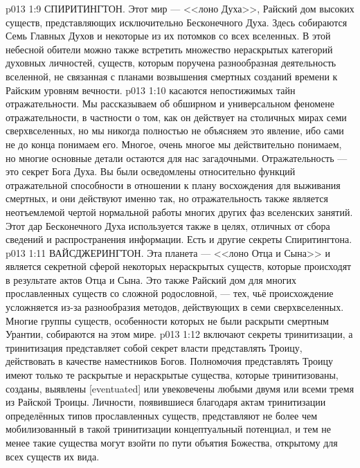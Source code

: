 \vs p013 1:9 СПИРИТИНГТОН. Этот мир --- <<лоно Духа>>, Райский дом высоких существ, представляющих исключительно Бесконечного Духа. Здесь собираются Семь Главных Духов и некоторые из их потомков со всех вселенных. В этой небесной обители можно также встретить множество нераскрытых категорий духовных личностей, существ, которым поручена разнообразная деятельность вселенной, не связанная с планами возвышения смертных созданий времени к Райским уровням вечности.
\vs p013 1:10 \pc {} касаются непостижимых тайн отражательности. Мы рассказываем об обширном и универсальном феномене отражательности, в частности о том, как он действует на столичных мирах семи сверхвселенных, но мы никогда полностью не объясняем это явление, ибо сами не до конца понимаем его. Многое, очень многое мы действительно понимаем, но многие основные детали остаются для нас загадочными. Отражательность --- это секрет Бога Духа. Вы были осведомлены относительно функций отражательной способности в отношении к плану восхождения для выживания смертных, и они действуют именно так, но отражательность также является неотъемлемой чертой нормальной работы многих других фаз вселенских занятий. Этот дар Бесконечного Духа используется также в целях, отличных от сбора сведений и распространения информации. Есть и другие секреты Спиритингтона.
\vs p013 1:11 ВАЙСДЖЕРИНГТОН. Эта планета --- <<лоно Отца и Сына>> и является секретной сферой некоторых нераскрытых существ, которые происходят в результате актов Отца и Сына. Это также Райский дом для многих прославленных существ со сложной родословной, --- тех, чьё происхождение усложняется из\hyp{}за разнообразия методов, действующих в семи сверхвселенных. Многие группы существ, особенности которых не были раскрыти смертным Урантии, собираются на этом мире.
\vs p013 1:12 \pc {} включают секреты тринитизации, а тринитизация представляет собой секрет власти представлять Троицу, действовать в качестве наместников Богов. Полномочия представлять Троицу имеют только те раскрытые и нераскрытые существа, которые тринитизованы, созданы, выявлены [eventuated] или увековечены любыми двумя или всеми тремя из Райской Троицы. Личности, появившиеся благодаря актам тринитизации определённых типов прославленных существ, представляют не более чем мобилизованный в такой тринитизации концептуальный потенциал, и тем не менее такие существа могут взойти по пути объятия Божества, открытому для всех существ их вида.
